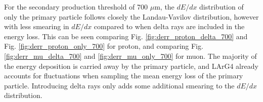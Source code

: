 For the secondary production threshold of 700 $\mu$m, the $dE/dx$ distribution of only the primary particle follows closely the Landau-Vavilov distribution, however with less smearing in $dE/dx$ compared to when delta rays are included in the energy loss.
This can be seen comparing Fig. \ref{fig:derr_proton_delta_700} and Fig. \ref{fig:derr_proton_only_700} for proton, and comparing Fig. \ref{fig:derr_mu_delta_700} and \ref{fig:derr_mu_only_700} for muon. 
The majority of the energy deposition is carried away by the primary particle, and LArG4 already accounts for fluctuations when sampling the mean energy loss of the primary particle.
Introducing delta rays only adds some additional smearing to the $dE/dx$ distribution.
